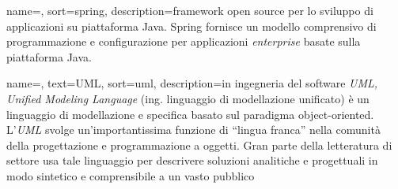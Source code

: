 {
	name=,
	sort=spring,
	description={framework open source per lo sviluppo di applicazioni su piattaforma Java. Spring fornisce un modello comprensivo di programmazione e configurazione per applicazioni \emph{enterprise} basate sulla piattaforma Java.}
}
		
{
    name=,
    text=UML,
    sort=uml,
    description={in ingegneria del software \emph{UML, Unified Modeling Language} (ing. linguaggio di modellazione unificato) è un linguaggio di modellazione e specifica basato sul paradigma object-oriented. L'\emph{UML} svolge un'importantissima funzione di ``lingua franca'' nella comunità della progettazione e programmazione a oggetti. Gran parte della letteratura di settore usa tale linguaggio per descrivere soluzioni analitiche e progettuali in modo sintetico e comprensibile a un vasto pubblico}
}
